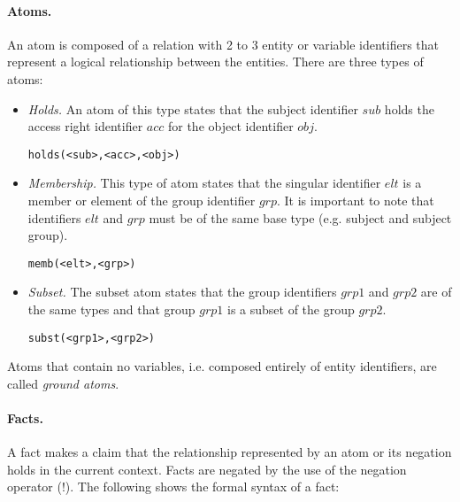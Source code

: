 \documentclass[11pt, twocolumn]{article}
\newenvironment{vverbose}
  {\begin{alltt}}
  {\vspace{-\baselineskip}\end{alltt}}
\begin{document}
        \paragraph{Atoms.}
          An atom is composed of a relation with 2 to 3 entity or variable
          identifiers that represent a logical relationship between the
          entities. There are three types of atoms:

          \begin{itemize}
            \item
              {\em Holds.} An atom of this type states that the subject
              identifier $sub$ holds the access right identifier $acc$
              for the object identifier $obj$.

              \begin{vverbose}
holds(<sub>, <acc>, <obj>)
              \end{vverbose}
            \item
              {\em Membership.} This type of atom states that the singular
              identifier $elt$ is a member or element of the group identifier
              $grp$. It is important to note that identifiers $elt$ and $grp$
              must be of the same base type (e.g. subject and subject group).

              \begin{vverbose}
memb(<elt>, <grp>)
              \end{vverbose}
            \item
              {\em Subset.} The subset atom states that the group identifiers
              $grp1$ and $grp2$ are of the same types and that group $grp1$ is
              a subset of the group $grp2$.

              \begin{vverbose}
subst(<grp1>, <grp2>)
              \end{vverbose}
          \end{itemize}

          Atoms that contain no variables, i.e. composed entirely of entity
          identifiers, are called {\em ground atoms}.

        \paragraph{Facts.}
          A fact makes a claim that the relationship represented by an atom or
          its negation holds in the current context. Facts are negated by the
          use of the negation operator ($!$). The following shows the formal
          syntax of a fact:
\end{document}
